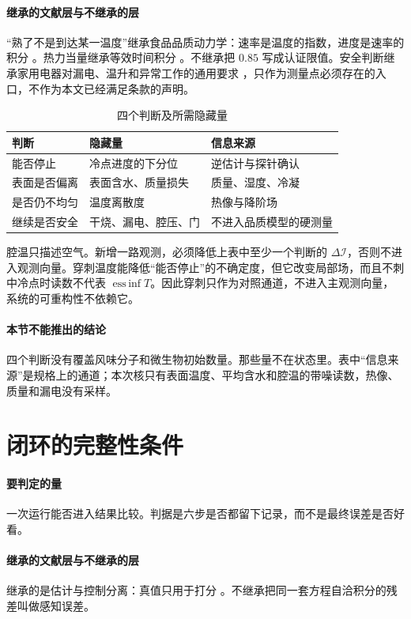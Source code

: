 \paragraph{继承的文献层与不继承的层}
“熟了不是到达某一温度”继承食品品质动力学：速率是温度的指数，进度是速率的积分 \cite{vanboekel2008}。热力当量继承等效时间积分 \cite{holdsworth1997}。不继承把 \(0.85\) 写成认证限值。安全判断继承家用电器对漏电、温升和异常工作的通用要求 \cite{iec60335,gb4706}，只作为测量点必须存在的入口，不作为本文已经满足条款的声明。

\begin{table}[ht]
\centering
\caption{四个判断及所需隐藏量}
\begin{tabularx}{\textwidth}{lXX}
\toprule
判断 & 隐藏量 & 信息来源 \\
\midrule
能否停止 & 冷点进度的下分位 & 逆估计与探针确认 \\
表面是否偏离 & 表面含水、质量损失 & 质量、湿度、冷凝 \\
是否仍不均匀 & 温度离散度 & 热像与降阶场 \\
继续是否安全 & 干烧、漏电、腔压、门 & 不进入品质模型的硬测量 \\
\bottomrule
\end{tabularx}
\end{table}

腔温只描述空气。新增一路观测，必须降低上表中至少一个判断的 \(\Delta\mathcal{I}\)，否则不进入观测向量。穿刺温度能降低“能否停止”的不确定度，但它改变局部场，而且不刺中冷点时读数不代表 \(\operatorname{ess\,inf} T\)。因此穿刺只作为对照通道，不进入主观测向量，系统的可重构性不依赖它。

\paragraph{本节不能推出的结论}
四个判断没有覆盖风味分子和微生物初始数量。那些量不在状态里。表中“信息来源”是规格上的通道；本次核只有表面温度、平均含水和腔温的带噪读数，热像、质量和漏电没有采样。

\section{闭环的完整性条件}

\paragraph{要判定的量}
一次运行能否进入结果比较。判据是六步是否都留下记录，而不是最终误差是否好看。

\paragraph{继承的文献层与不继承的层}
继承的是估计与控制分离：真值只用于打分 \cite{rawlings2017}。不继承把同一套方程自洽积分的残差叫做感知误差。

